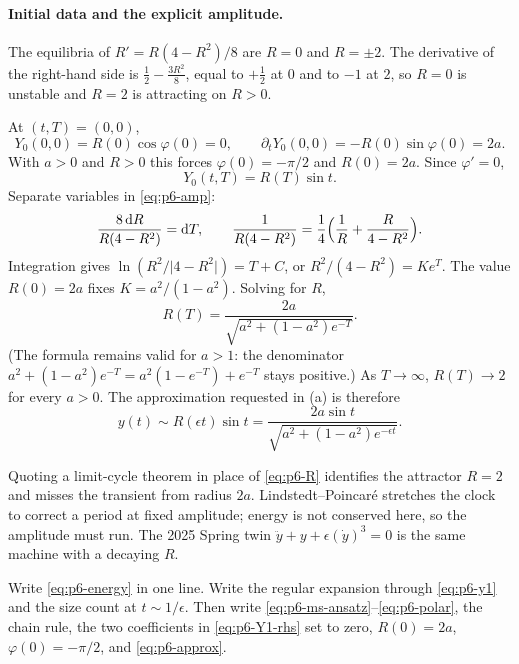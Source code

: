 \paragraph{Initial data and the explicit amplitude.}

The equilibria of \(R'=R(4-R^2)/8\) are \(R=0\) and \(R=\pm 2\). The derivative of the right-hand side is \(\frac12-\frac{3R^2}{8}\), equal to \(+\frac12\) at \(0\) and to \(-1\) at \(2\), so \(R=0\) is unstable and \(R=2\) is attracting on \(R>0\).

At \((t,T)=(0,0)\),
\[
Y_0(0,0)=R(0)\cos\varphi(0)=0,
\qquad
\partial_t Y_0(0,0)=-R(0)\sin\varphi(0)=2a.
\]
With \(a>0\) and \(R>0\) this forces \(\varphi(0)=-\pi/2\) and \(R(0)=2a\). Since \(\varphi'=0\),
\[
Y_0(t,T)=R(T)\sin t.
\]
Separate variables in \eqref{eq:p6-amp}:
\[
\frac{8\,\mathrm{d}R}{R(4-R^2)}=\mathrm{d}T,
\qquad
\frac{1}{R(4-R^2)}
=
\frac14\Bigl(\frac{1}{R}+\frac{R}{4-R^2}\Bigr).
\]
Integration gives \(\ln(R^2/\lvert 4-R^2\rvert)=T+C\), or \(R^2/(4-R^2)=Ke^{T}\). The value \(R(0)=2a\) fixes \(K=a^2/(1-a^2)\). Solving for \(R\),
\begin{equation}
\label{eq:p6-R}
R(T)
=
\frac{2a}{\sqrt{a^2+(1-a^2)e^{-T}}}.
\end{equation}
(The formula remains valid for \(a>1\): the denominator \(a^2+(1-a^2)e^{-T}=a^2(1-e^{-T})+e^{-T}\) stays positive.) As \(T\to\infty\), \(R(T)\to 2\) for every \(a>0\). The approximation requested in (a) is therefore
\begin{equation}
\label{eq:p6-approx}
y(t)
\sim
R(\epsilon t)\sin t
=
\frac{2a\sin t}{\sqrt{a^2+(1-a^2)e^{-\epsilon t}}}.
\end{equation}

\begin{warning}
\label{warn:p6-lindstedt-vs-ms}
Quoting a limit-cycle theorem in place of \eqref{eq:p6-R} identifies the attractor \(R=2\) and misses the transient from radius \(2a\). Lindstedt--Poincar\'e stretches the clock to correct a period at fixed amplitude; energy is not conserved here, so the amplitude must run. The 2025 Spring twin \(\ddot y+y+\epsilon(\dot y)^3=0\) is the same machine with a decaying \(R\).
\end{warning}

\begin{examnote}
\label{examnote:p6-script}
Write \eqref{eq:p6-energy} in one line. Write the regular expansion through \eqref{eq:p6-y1} and the size count at \(t\sim 1/\epsilon\). Then write \eqref{eq:p6-ms-ansatz}--\eqref{eq:p6-polar}, the chain rule, the two coefficients in \eqref{eq:p6-Y1-rhs} set to zero, \(R(0)=2a\), \(\varphi(0)=-\pi/2\), and \eqref{eq:p6-approx}.
\end{examnote}

